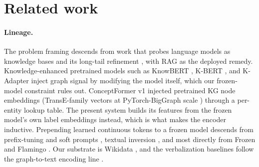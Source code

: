 \documentclass{article}
\begin{document}
\section{Related work}
\label{sec:related}

\paragraph{Lineage.} The problem framing descends from work that probes language models as
knowledge bases \citep{lama,roberts} and its long-tail refinement
\citep{headtotail,emptyshelves,ftvsrag}, with RAG \citep{rag} as the deployed remedy. Knowledge-enhanced pretrained models such as
KnowBERT \citep{knowbert}, K-BERT \citep{kbert}, and K-Adapter \citep{kadapter} inject graph
signal by modifying the model itself, which our frozen-model constraint rules out.
ConceptFormer v1 \citep{cfv1} injected pretrained KG node embeddings (TransE-family vectors at
PyTorch-BigGraph scale \citep{transe,pbg}) through a per-entity lookup table. The present
system builds its features from the frozen model's own label embeddings instead, which is what
makes the encoder inductive. Prepending learned continuous tokens to a frozen model descends
from prefix-tuning and soft prompts \citep{prefixtuning,lester,qineisner}, textual inversion
\citep{textualinversion}, and most directly from Frozen \citep{frozenlm} and Flamingo
\citep{flamingo}. Our substrate is Wikidata \citep{wikidata}, and the verbalization baselines
follow the graph-to-text encoding line \citep{talklikeagraph}.
\end{document}
